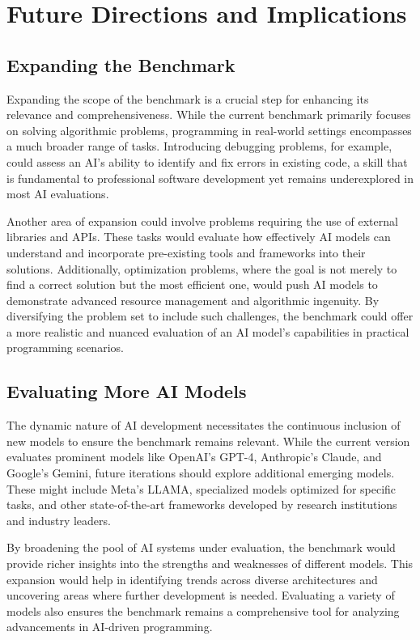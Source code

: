 
\section{Future Directions and Implications}


\subsection{Expanding the Benchmark}
Expanding the scope of the benchmark is a crucial step for enhancing its relevance and comprehensiveness. While the current benchmark primarily focuses on solving algorithmic problems, programming in real-world settings encompasses a much broader range of tasks. Introducing debugging problems, for example, could assess an AI’s ability to identify and fix errors in existing code, a skill that is fundamental to professional software development yet remains underexplored in most AI evaluations.

Another area of expansion could involve problems requiring the use of external libraries and APIs. These tasks would evaluate how effectively AI models can understand and incorporate pre-existing tools and frameworks into their solutions. Additionally, optimization problems, where the goal is not merely to find a correct solution but the most efficient one, would push AI models to demonstrate advanced resource management and algorithmic ingenuity. By diversifying the problem set to include such challenges, the benchmark could offer a more realistic and nuanced evaluation of an AI model's capabilities in practical programming scenarios.



\subsection{Evaluating More AI Models}
The dynamic nature of AI development necessitates the continuous inclusion of new models to ensure the benchmark remains relevant. While the current version evaluates prominent models like OpenAI’s GPT-4, Anthropic’s Claude, and Google’s Gemini, future iterations should explore additional emerging models. These might include Meta’s LLAMA, specialized models optimized for specific tasks, and other state-of-the-art frameworks developed by research institutions and industry leaders.

By broadening the pool of AI systems under evaluation, the benchmark would provide richer insights into the strengths and weaknesses of different models. This expansion would help in identifying trends across diverse architectures and uncovering areas where further development is needed. Evaluating a variety of models also ensures the benchmark remains a comprehensive tool for analyzing advancements in AI-driven programming.

